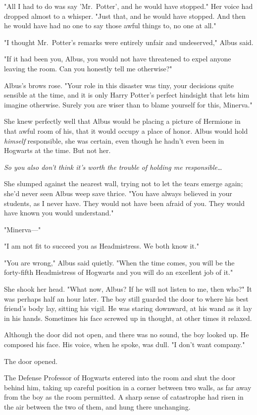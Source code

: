 "All I had to do was say 'Mr.~Potter', and he would have stopped." Her voice had dropped almost to a whisper. "Just that, and he would have stopped. And then he would have had no one to say those awful things to, no one at all."

"I thought Mr.~Potter's remarks were entirely unfair and undeserved," Albus said.

"If it had been you, Albus, you would not have threatened to expel anyone leaving the room. Can you honestly tell me otherwise?"

Albus's brows rose. "Your role in this disaster was tiny, your decisions quite sensible at the time, and it is only Harry Potter's perfect hindsight that lets him imagine otherwise. Surely you are wiser than to blame yourself for this, Minerva."

She knew perfectly well that Albus would be placing a picture of Hermione in that awful room of his, that it would occupy a place of honor. Albus would hold \emph{himself} responsible, she was certain, even though he hadn't even been in Hogwarts at the time. But not her.

\emph{So you also don't think it's worth the trouble of holding me responsible{\ldots}}

She slumped against the nearest wall, trying not to let the tears emerge again; she'd never seen Albus weep save thrice. "You have always believed in your students, as I never have. They would not have been afraid of you. They would have known you would understand."

"Minerva---"

"I am not fit to succeed you as Headmistress. We both know it."

"You are wrong," Albus said quietly. "When the time comes, you will be the forty-fifth Headmistress of Hogwarts and you will do an excellent job of it."

She shook her head. "What now, Albus? If he will not listen to me, then who?"
\sbreak
It was perhaps half an hour later. The boy still guarded the door to where his best friend's body lay, sitting his vigil. He was staring downward, at his wand as it lay in his hands. Sometimes his face screwed up in thought, at other times it relaxed.

Although the door did not open, and there was no sound, the boy looked up. He composed his face. His voice, when he spoke, was dull. "I don't want company."

The door opened.

The Defense Professor of Hogwarts entered into the room and shut the door behind him, taking up careful position in a corner between two walls, as far away from the boy as the room permitted. A sharp sense of catastrophe had risen in the air between the two of them, and hung there unchanging.

